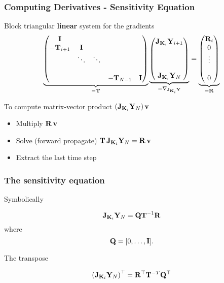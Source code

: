 \documentclass[12pt,fleqn,handout]{beamer}
\begin{document}
\begin{frame}[fragile]\frametitle{Computing Derivatives - Sensitivity Equation}

Block triangular {\bf linear} system for the gradients
{\small
\begin{eqnarray*}
	\underbrace{
\begin{pmatrix}
{\bf I}              &                &                &          &       \\
-{\bf T}_{i+1}    &   {\bf I}       &                &          &       \\
                    & \ddots    &  \ddots    &          &      \\
                    &     &      &          &      \\
                    &     &        &   -{\bf T}_{N-1}       & {\bf I}
                    \end{pmatrix}}_{={\bf T}}
					\underbrace{
                    \begin{pmatrix}
                    {\bf J}_{{\bf K}_i}{\bf Y}_{i+1} \\    \\   \\ \\   {\bf J}_{{\bf K}_i}{\bf Y}_{N}
                    \end{pmatrix}}_{= \nabla_{{\bf J}_{{\bf K}_i} {\bf Y}}} =
					\underbrace{
                    \begin{pmatrix}
                    {\bf R}_i \\  0\\  \vdots \\ \\    0
                    \end{pmatrix}}_{={\bf R}}
\end{eqnarray*}}

To compute matrix-vector product $({\bf J}_{{\bf K}_i}{\bf Y}_{N})\, {\bf v}$
\begin{itemize}
\item Multiply ${\bf R}\, {\bf v}$
\item Solve (forward propagate) ${\bf T}\, {\bf J}_{{\bf K}_i}{\bf Y}_N = {\bf R}\, {\bf v}$
\item Extract the last time step
\end{itemize}

\end{frame}

\begin{frame}[fragile]\frametitle{The sensitivity equation}


Symbolically

$$ {\bf J}_{{\bf K}_i}{\bf Y}_{N}  = {\bf Q} {\bf T}^{-1}  {\bf R}  $$
where
$${\bf Q} = [0,\ldots,{\bf I}]. $$


\bigskip

The transpose

$$ \left({\bf J}_{{\bf K}_i}{\bf Y}_{N}\right)^{\top} =  {\bf R}^{\top} {\bf T}^{-T} {\bf Q}^{\top} $$


\end{frame}
\end{document}
